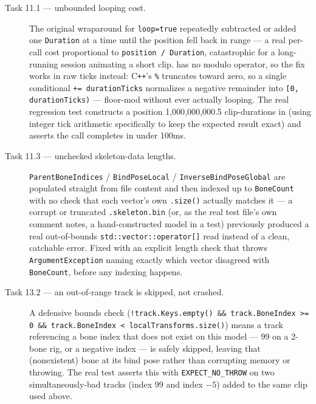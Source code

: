 \begin{description}
  \item[Task 11.1 --- unbounded looping cost.] The original wraparound for \texttt{loop=true}
        repeatedly subtracted or added one \texttt{Duration} at a time until the position fell
        back in range --- a real per-call cost proportional to \texttt{position / Duration},
        catastrophic for a long-running session animating a short clip.
         has no modulo operator, so the fix works in raw ticks
        instead: C\texttt{++}'s \texttt{\%} truncates toward zero, so a single conditional
        \texttt{+= durationTicks} normalizes a negative remainder into
        \texttt{[0, durationTicks)} --- floor-mod without ever actually looping. The real
        regression test constructs a position 1{,}000{,}000{,}000.5 clip-durations in (using
        integer tick arithmetic specifically to keep the expected result exact) and asserts
        the call completes in under 100ms.
  \item[Task 11.3 --- unchecked skeleton-data lengths.] \texttt{ParentBoneIndices} /
        \texttt{BindPoseLocal} / \texttt{InverseBindPoseGlobal} are populated straight from
        file content and then indexed up to \texttt{BoneCount} with no check that each
        vector's own \texttt{.size()} actually matches it --- a corrupt or truncated
        \texttt{.skeleton.bin} (or, as the real test file's own comment notes, a
        hand-constructed model in a test) previously produced a real out-of-bounds
        \texttt{std::vector::operator[]} read instead of a clean, catchable error. Fixed with
        an explicit length check that throws \texttt{ArgumentException} naming exactly which
        vector disagreed with \texttt{BoneCount}, before any indexing happens.
  \item[Task 13.2 --- an out-of-range track is skipped, not crashed.] A defensive bounds check
        (\texttt{!track.Keys.empty() \&\& track.BoneIndex >= 0 \&\& track.BoneIndex <
        localTransforms.size()}) means a track referencing a bone index that does not exist on
        this model --- 99 on a 2-bone rig, or a negative index --- is safely skipped, leaving
        that (nonexistent) bone at its bind pose rather than corrupting memory or throwing. The
        real test asserts this with \texttt{EXPECT\_NO\_THROW} on two simultaneously-bad tracks
        (index 99 and index $-5$) added to the same clip used above.
\end{description}

